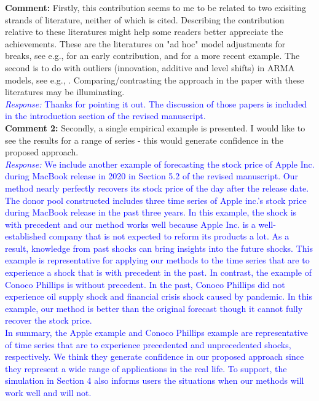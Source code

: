\documentclass[12pt]{article}
\newcommand{\response}[1]{\noindent \textcolor{blue}{\emph{Response:} #1}}
\begin{document}
{\bf Comment:} Firstly, this contribution seems to me to be related to two exisiting strands of literature, neither of which is cited. Describing the contribution relative to these literatures might help some readers better appreciate the achievements.
These are the literatures on "ad hoc" model adjustments for breaks, see e.g.,  \cite{clements1996intercept} for an early contribution, and \cite{castle2015robust} for a more recent example. The second is to do with outliers (innovation, additive and level shifts) in ARMA models, see e.g., \cite{tsay1986time}. Comparing/contrasting the approach in the paper with these literatures may be illuminating. \\

\response{Thanks for pointing it out. The discussion of those papers is included in the introduction section of the revised manuscript.}\\

{\bf Comment 2:} Secondly, a single empirical example is presented. I would like to see the results for a range of series - this would generate confidence in the proposed approach. \\

\response{We include another example of forecasting the stock price of Apple Inc. during MacBook release in 2020 in Section 5.2 of the revised manuscript. Our method nearly perfectly recovers its stock price of the day after the release date. The donor pool constructed includes three time series of  Apple inc.'s stock price during MacBook release in the past three years. In this example, the shock is with precedent and our method works well because Apple Inc. is a well-established company that is not expected to reform its products a lot. As a result, knowledge from past shocks can bring insights into the future shocks. This example is representative for applying our methods to the time series that are to experience a shock that is with precedent in the past. In contrast, the example of Conoco Phillips is without precedent. In the past, Conoco Phillips  did not experience oil supply shock and financial crisis shock caused by  pandemic. In this example, our method is better than the original forecast though it cannot fully recover the stock price. \\

In summary, the Apple example and Conoco Phillips example are representative of time series that are to experience precedented and unprecedented shocks, respectively. We think they generate confidence in our proposed approach since they  represent a wide range of applications in the real life. To support, the simulation  in Section 4 also informs  users the situations when our methods will work well and will not.
}
\end{document}
